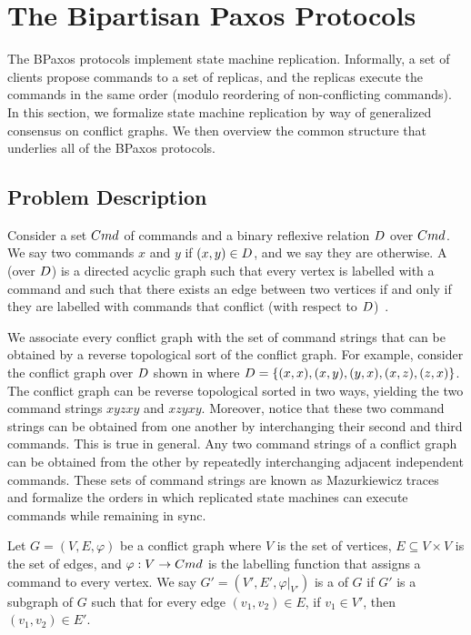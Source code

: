 \section{The Bipartisan Paxos Protocols}
The BPaxos protocols implement state machine replication. Informally, a set of
clients propose commands to a set of replicas, and the replicas execute the
commands in the same order (modulo reordering of non-conflicting commands). In
this section, we formalize state machine replication by way of generalized
consensus on conflict graphs. We then overview the common structure that
underlies all of the BPaxos protocols.

\subsection{Problem Description}
{}

Consider a set $Cmd$ of commands and a binary reflexive relation $D$
over $Cmd$. We say two commands $x$ and $y$  if $(x, y) \in
D$, and we say they are  otherwise. A
 (over $D$) is a directed acyclic graph such
that every vertex is labelled with a command and such that there exists an edge
between two vertices if and only if they are labelled with commands that
conflict (with respect to $D$)~\cite{mazurkiewicz1995introduction}.

We associate every conflict graph with the set of command strings that can be
obtained by a reverse topological sort of the conflict graph. For example,
consider the conflict graph over $D$ shown in
 where
  $D = \{(x, x), (x, y), (y, x), (x, z), (z, x)\}$.
The conflict graph can be reverse topological sorted in two ways, yielding the
two command strings $xyzxy$ and $xzyxy$. Moreover, notice that these two
command strings can be obtained from one another by interchanging their second
and third commands. This is true in general. Any two command strings of a
conflict graph can be obtained from the other by repeatedly interchanging
adjacent independent commands. These sets of command strings are known as
Mazurkiewicz traces~\cite{mazurkiewicz1985semantics,
mazurkiewicz1995introduction} and formalize the orders in which replicated
state machines can execute commands while remaining in sync.

Let $G = (V, E, \varphi)$ be a conflict graph where $V$ is the set of vertices,
$E \subseteq V \times V$ is the set of edges, and $\varphi: V \to Cmd$ is the
labelling function that assigns a command to every vertex. We say $G' = (V',
E', \varphi|_{V'})$ is a  of $G$ if $G'$ is a subgraph of $G$
such that for every edge $(v_1, v_2) \in E$, if $v_1 \in V'$, then $(v_1, v_2)
\in E'$.

